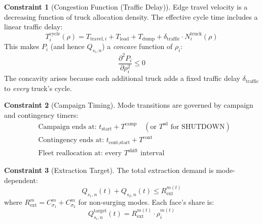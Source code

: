 \documentclass[11pt,a4paper]{article}
\theoremstyle{definition}
\newtheorem{constraint}{Constraint}[section]
\begin{document}
\begin{constraint}[Congestion Function (Traffic Delay)]
\label{con:congestion}
Edge travel velocity is a decreasing function of truck allocation density.
The effective cycle time includes a linear traffic delay:
\begin{equation}
  T_i^{\text{cycle}}(\rho) = T_{\text{travel},i} + T_{\text{load}} + T_{\text{dump}}
    + \delta_{\text{traffic}} \cdot N_i^{\text{truck}}(\rho)
\end{equation}
This makes $P_i$ (and hence $Q_{s_i,n}$) a \emph{concave} function of
$\rho_i$:
\begin{equation}
  \frac{\partial^2 P_i}{\partial \rho_i^2} \leq 0
\end{equation}
The concavity arises because each additional truck adds a fixed traffic delay
$\delta_{\text{traffic}}$ to \emph{every} truck's cycle.
\end{constraint}

\begin{constraint}[Campaign Timing]
\label{con:timing}
Mode transitions are governed by campaign and contingency timers:
\begin{align}
  &\text{Campaign ends at: } t_{\text{start}} + T^{\text{camp}} \quad (\text{or } T^{\text{sd}} \text{ for SHUTDOWN}) \\
  &\text{Contingency ends at: } t_{\text{cont,start}} + T^{\text{cont}} \\
  &\text{Fleet reallocation at: every } T^{\text{shift}} \text{ interval}
\end{align}
\end{constraint}

\begin{constraint}[Extraction Target]
\label{con:extraction-target}
The total extraction demand is mode-dependent:
\begin{equation}
  Q_{s_1,n}(t) + Q_{s_2,n}(t) \leq R^{m(t)}_{\text{ext}}
\end{equation}
where $R^m_{\text{ext}} = C^m_{\sigma_1} + C^m_{\sigma_2}$ for non-surging modes.
Each face's share is:
\begin{equation}
  Q_{s_i,n}^{\text{target}}(t) = R^{m(t)}_{\text{ext}} \cdot \rho_i^{m(t)}
\end{equation}
\end{constraint}
\end{document}
